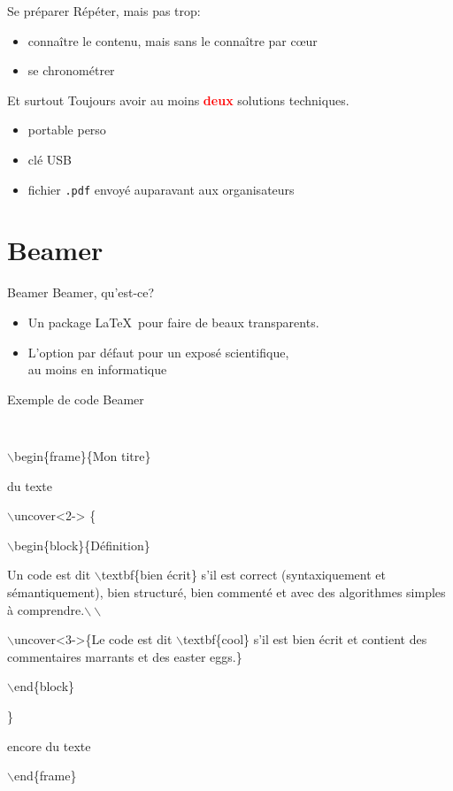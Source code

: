 \documentclass[12pt]{beamer}
\begin{document}
\begin{frame}{Se préparer}
  Répéter, mais pas trop: 
  \begin{itemize}
    \item connaître le contenu, mais sans le connaître par cœur
    \item se chronométrer
  \end{itemize}

  \medskip

  \begin{alertblock}{Et surtout}
    Toujours avoir au moins \textcolor{red}{\bf deux} solutions techniques.
    \begin{itemize}
      \item portable perso 
      \item clé USB
      \item fichier {\tt .pdf} envoyé auparavant aux organisateurs
    \end{itemize}
  \end{alertblock}
\end{frame}

\section{Beamer}

\begin{frame}{Beamer}
  Beamer, qu'est-ce?
  \begin{itemize}
    \item Un package \LaTeX~pour faire de beaux transparents.
    \item L'option par défaut pour un exposé scientifique, \\ au moins en informatique
  \end{itemize}
\end{frame}

\begin{frame}{Exemple de code Beamer}
\begin{lstlisting}
 
\end{lstlisting}

\footnotesize
\tt{
$\backslash$begin\{frame\}\{Mon titre\}

du texte
  
$\backslash$uncover<2-> \{

$\backslash$begin\{block\}\{Définition\}

Un code est dit $\backslash$textbf\{bien écrit\} s'il est correct (syntaxiquement et sémantiquement), bien structuré, bien commenté et avec des algorithmes simples à comprendre.$\backslash\backslash$

$\backslash$uncover<3->\{Le code est dit $\backslash$textbf\{cool\} s'il est bien écrit et contient des commentaires marrants et des easter eggs.\}

$\backslash$end\{block\}

\}

encore du texte

$\backslash$end\{frame\}
}
\end{frame}
\end{document}
